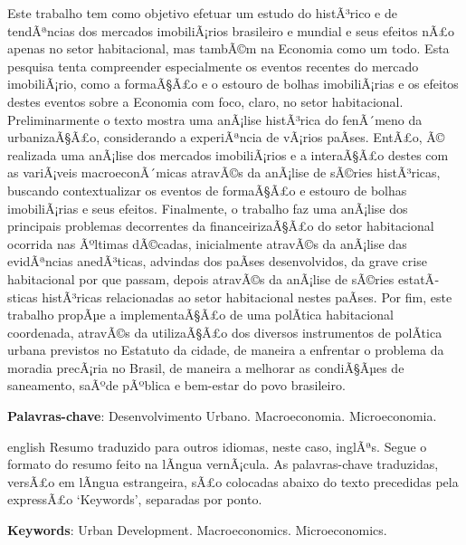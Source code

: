 \documentclass[
	12pt,				%
	oneside,			%
	a4paper,			%
	chapter=TITLE,		%
	section=TITLE,		%
	english,			%
	brazil				%
	]{abntex2}
\begin{document}
\setlength{\absparsep}{18pt} %
\begin{resumo}
	\SingleSpacing
  Este trabalho tem como objetivo efetuar um estudo do histÃ³rico e de tendÃªncias
  dos mercados imobiliÃ¡rios brasileiro e mundial e seus efeitos nÃ£o apenas no
  setor habitacional, mas tambÃ©m na Economia como um todo. Esta pesquisa tenta
  compreender especialmente os eventos recentes do mercado imobiliÃ¡rio, como a
  formaÃ§Ã£o e o estouro de bolhas imobiliÃ¡rias e os efeitos destes eventos sobre a
  Economia com foco, claro, no setor habitacional. Preliminarmente o texto mostra
  uma anÃ¡lise histÃ³rica do fenÃ´meno da urbanizaÃ§Ã£o, considerando a experiÃªncia de
  vÃ¡rios paÃ­ses. EntÃ£o, Ã© realizada uma anÃ¡lise dos mercados imobiliÃ¡rios e a
  interaÃ§Ã£o destes com as variÃ¡veis macroeconÃ´micas atravÃ©s da anÃ¡lise de sÃ©ries
  histÃ³ricas, buscando contextualizar os eventos de formaÃ§Ã£o e estouro de bolhas
  imobiliÃ¡rias e seus efeitos. Finalmente, o trabalho faz uma anÃ¡lise dos
  principais problemas decorrentes da financeirizaÃ§Ã£o do setor habitacional
  ocorrida nas Ãºltimas dÃ©cadas, inicialmente atravÃ©s da anÃ¡lise das evidÃªncias
  anedÃ³ticas, advindas dos paÃ­ses desenvolvidos, da grave crise habitacional por
  que passam, depois atravÃ©s da anÃ¡lise de sÃ©ries estatÃ­sticas histÃ³ricas
  relacionadas ao setor habitacional nestes paÃ­ses. Por fim, este trabalho propÃµe
  a implementaÃ§Ã£o de uma polÃ­tica habitacional coordenada, atravÃ©s da utilizaÃ§Ã£o
  dos diversos instrumentos de polÃ­tica urbana previstos no Estatuto da cidade, de
  maneira a enfrentar o problema da moradia precÃ¡ria no Brasil, de maneira a
  melhorar as condiÃ§Ãµes de saneamento, saÃºde pÃºblica e bem-estar do povo
  brasileiro. 
  
  \textbf{Palavras-chave}: 
    Desenvolvimento Urbano.
    Macroeconomia.
    Microeconomia.
  \end{resumo}
\begin{resumo}[Abstract]
	\SingleSpacing
	\begin{otherlanguage*}{english}
		Resumo traduzido para outros idiomas, neste caso, inglÃªs. Segue o formato do resumo feito na lÃ­ngua vernÃ¡cula. As palavras-chave traduzidas, versÃ£o em lÃ­ngua estrangeira, sÃ£o colocadas abaixo do texto precedidas pela expressÃ£o `Keywords', separadas por ponto.
		
		\textbf{Keywords}:
	      Urban Development.
        Macroeconomics.
        Microeconomics.
    	\end{otherlanguage*}
\end{resumo}
\end{document}
